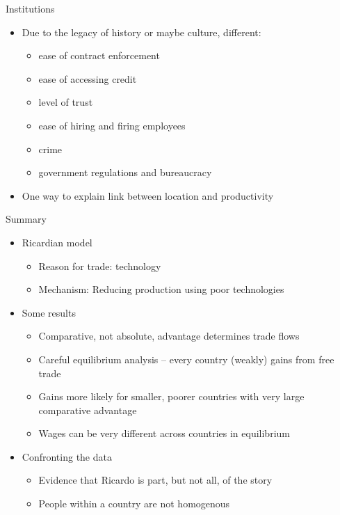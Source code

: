 \documentclass[ignorenonframetext,]{beamer}
\begin{document}
\begin{frame}{Institutions}

    \begin{itemize}
        \item Due to the legacy of history or maybe culture, different:
        \begin{itemize}
            \item ease of contract enforcement
            \item ease of accessing credit 
            \item level of trust 
            \item ease of hiring and firing employees 
            \item crime 
            \item government regulations and bureaucracy 
        \end{itemize}
        \item One way to explain link between location and productivity
    \end{itemize}

\end{frame}

\begin{frame}{Summary}

    \begin{itemize}
        \item Ricardian model
        \begin{itemize}
            \item Reason for trade: technology
            \item Mechanism: Reducing production using poor technologies
        \end{itemize}
        \item Some results
        \begin{itemize}
            \item Comparative, not absolute, advantage determines trade flows 
            \item Careful equilibrium analysis -- every country (weakly) gains from free trade
            \item Gains more likely for smaller, poorer countries with very large comparative advantage
            \item Wages can be very different across countries in equilibrium
        \end{itemize}
        \item Confronting the data
        \begin{itemize}
            \item Evidence that Ricardo is part, but not all, of the story
            \item People within a country are not homogenous
        \end{itemize}
    \end{itemize}

\end{frame}
\end{document}
